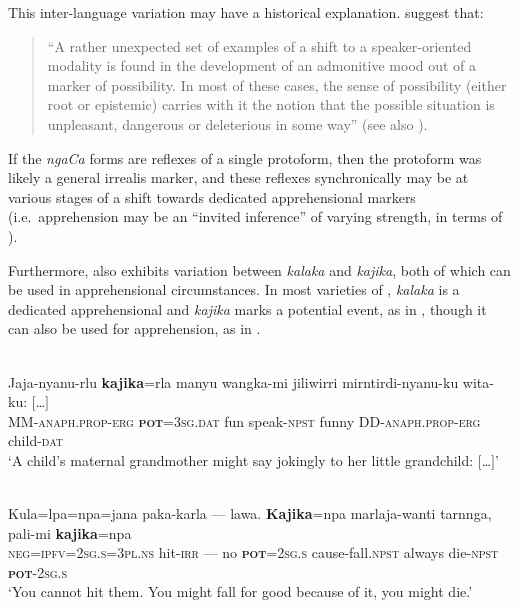 \documentclass[output=paper,colorlinks,citecolor=brown]{langscibook}
\begin{document}
 This inter-language variation may have a historical explanation. \citet[211]{bybee_evolution_1994} suggest that:
\begin{quote}
    ``A rather unexpected set of examples of a shift to a speaker-oriented modality is found in the development of an admonitive mood out of a marker of possibility. In most of these cases, the sense of possibility (either root or epistemic) carries with it the notion that the possible situation is unpleasant, dangerous or deleterious in some way'' (see also \cite{pakendorf_possibility_2007}).
\end{quote}

\noindent If the \textit{ngaCa} forms are reflexes of a single protoform, then the protoform was likely a general irrealis marker, and these reflexes synchronically may be at various stages of a shift towards dedicated apprehensional markers (i.e.\  apprehension may be an ``invited inference'' of varying strength, in terms of \cite[34--40]{traugott_regularity_2004}).

Furthermore,  also exhibits variation between \textit{kalaka} and \textit{kajika}, both of which can be used in apprehensional circumstances. In  most varieties of , \textit{kalaka} is a dedicated apprehensional and \textit{kajika} marks a potential event, as in , though it can also be used for apprehension, as in . 


\ea 
{} \\
\gll Jaja-nyanu-rlu \textbf{kajika}=rla manyu wangka-mi jiliwirri  mirntirdi-nyanu-ku wita-ku: $[$\ldots$]$ \\
MM-\textsc{anaph.prop-erg} \textsc{\textbf{pot}=3sg.dat} fun speak-\textsc{npst} funny DD-\textsc{anaph.prop-erg} child-\textsc{dat} \\
\glt `A child's maternal grandmother might say jokingly to her little grandchild: $[$\ldots$]$'
\label{ex:bro69}
\z

\ea 
{} \\
\gll Kula=lpa=npa=jana paka-karla --- lawa. \textbf{Kajika}=npa marlaja-wanti tarnnga, pali-mi \textbf{kajika}=npa \\
\textsc{neg=ipfv=2sg.s=3pl.ns} hit-\textsc{irr} --- no \textsc{\textbf{pot}=2sg.s} cause-fall.\textsc{npst} always die-\textsc{npst} \textsc{\textbf{pot}-2sg.s} \\
\glt `You cannot hit them. You might fall for good because of it, you might die.'
\label{ex:bro70}
\z
\end{document}
